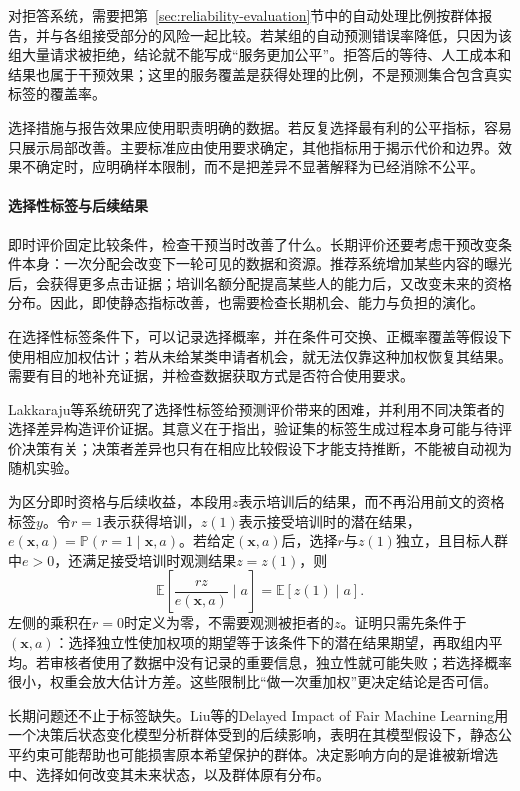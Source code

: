 对拒答系统，需要把第~\ref{sec:reliability-evaluation}节中的自动处理比例按群体报告，并与各组接受部分的风险一起比较。若某组的自动预测错误率降低，只因为该组大量请求被拒绝，结论就不能写成“服务更加公平”。拒答后的等待、人工成本和结果也属于干预效果；这里的服务覆盖是获得处理的比例，不是预测集合包含真实标签的覆盖率。

选择措施与报告效果应使用职责明确的数据。若反复选择最有利的公平指标，容易只展示局部改善。主要标准应由使用要求确定，其他指标用于揭示代价和边界。效果不确定时，应明确样本限制，而不是把差异不显著解释为已经消除不公平。

\paragraph{选择性标签与后续结果}

即时评价固定比较条件，检查干预当时改善了什么。长期评价还要考虑干预改变条件本身：一次分配会改变下一轮可见的数据和资源。推荐系统增加某些内容的曝光后，会获得更多点击证据；培训名额分配提高某些人的能力后，又改变未来的资格分布。因此，即使静态指标改善，也需要检查长期机会、能力与负担的演化。

在选择性标签条件下，可以记录选择概率，并在条件可交换、正概率覆盖等假设下使用相应加权估计；若从未给某类申请者机会，就无法仅靠这种加权恢复其结果。需要有目的地补充证据，并检查数据获取方式是否符合使用要求。

Lakkaraju等系统研究了选择性标签给预测评价带来的困难，并利用不同决策者的选择差异构造评价证据。其意义在于指出，验证集的标签生成过程本身可能与待评价决策有关；决策者差异也只有在相应比较假设下才能支持推断，不能被自动视为随机实验。

为区分即时资格与后续收益，本段用$z$表示培训后的结果，而不再沿用前文的资格标签$y$。令$r=1$表示获得培训，$z(1)$表示接受培训时的潜在结果，$e(\bm{x},a)=\mathbb P(r=1\mid\bm{x},a)$。若给定$(\bm{x},a)$后，选择$r$与$z(1)$独立，且目标人群中$e>0$，还满足接受培训时观测结果$z=z(1)$，则
\begin{equation}
 \mathbb E\!\left[\frac{r z}{e(\bm{x},a)}\mid a\right]
 =\mathbb E[z(1)\mid a].
 \label{eq:fairness-selective-weight}
\end{equation}
左侧的乘积在$r=0$时定义为零，不需要观测被拒者的$z$。证明只需先条件于$(\bm{x},a)$：选择独立性使加权项的期望等于该条件下的潜在结果期望，再取组内平均。若审核者使用了数据中没有记录的重要信息，独立性就可能失败；若选择概率很小，权重会放大估计方差。这些限制比“做一次重加权”更决定结论是否可信。

长期问题还不止于标签缺失。Liu等的Delayed Impact of Fair Machine Learning用一个决策后状态变化模型分析群体受到的后续影响，表明在其模型假设下，静态公平约束可能帮助也可能损害原本希望保护的群体。决定影响方向的是谁被新增选中、选择如何改变其未来状态，以及群体原有分布。

